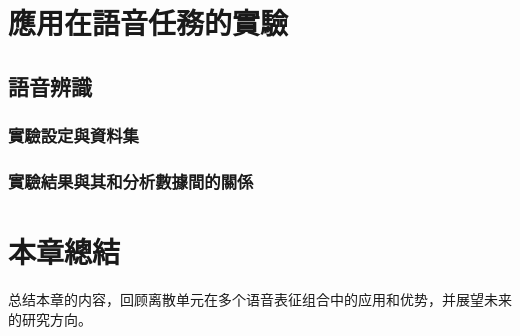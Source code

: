  
\section{應用在語音任務的實驗}

\subsection{語音辨識}

\subsubsection{實驗設定與資料集}

\subsubsection{實驗結果與其和分析數據間的關係}



\section{本章總結}

总结本章的内容，回顾离散单元在多个语音表征组合中的应用和优势，并展望未来的研究方向。
